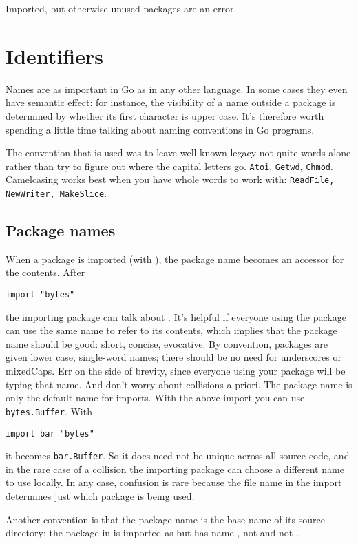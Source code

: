 \noindent{}Imported, but otherwise unused packages are an error.

\section{Identifiers}
Names are as important in Go as in any other language. In some cases
they even have semantic effect: for instance, the visibility of a name
outside a package is determined by whether its first character is upper
case. It's therefore worth spending a little time talking about naming
conventions in Go programs.

The convention that is used was to leave well-known legacy
not-quite-words alone rather than try to figure out where
the capital letters go.  \lstinline{Atoi}, \lstinline{Getwd},
\lstinline{Chmod}.
Camelcasing works best when you have whole words
to work with: \lstinline{ReadFile, NewWriter, MakeSlice}.

\subsection{Package names}
When a package is imported (with ), the package name becomes 
an accessor for the contents. After
\begin{lstlisting}
import "bytes"
\end{lstlisting}
the importing package can talk about . It's helpful if
everyone using the package can use the same name to refer to its
contents, which implies that the package name should be good: short,
concise, evocative. By convention, packages are given lower case,
single-word names; there should be no need for underscores or mixedCaps.
Err on the side of brevity, since everyone using your package will be
typing that name. And don't worry about collisions a priori. The package
name is only the default name for imports. With the above import 
you can use \lstinline{bytes.Buffer}. With 
\begin{lstlisting}
import bar "bytes"
\end{lstlisting}
it becomes \lstinline{bar.Buffer}.
So it does need not be unique across
all source code, and in the rare case of a collision the importing
package can choose a different name to use locally. In any case,
confusion is rare because the file name in the import determines just
which package is being used.

Another convention is that the package name is the base name of its
source directory; the package in  is imported as
 but has name , not
 and not
.

